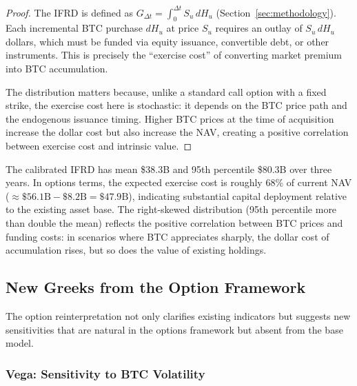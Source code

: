 \begin{proof}
The IFRD is defined as $G_{\Delta t} = \int_0^{\Delta t} S_u\, dH_u$ (Section~\ref{sec:methodology}). Each incremental BTC purchase $dH_u$ at price $S_u$ requires an outlay of $S_u\, dH_u$ dollars, which must be funded via equity issuance, convertible debt, or other instruments. This is precisely the ``exercise cost'' of converting market premium into BTC accumulation.

The distribution matters because, unlike a standard call option with a fixed strike, the exercise cost here is stochastic: it depends on the BTC price path and the endogenous issuance timing. Higher BTC prices at the time of acquisition increase the dollar cost but also increase the NAV, creating a positive correlation between exercise cost and intrinsic value.
\end{proof}

\begin{remark}
\label{rem:ifrd_calibrated}
The calibrated IFRD has mean \$38.3B and 95th percentile \$80.3B over three years. In options terms, the expected exercise cost is roughly 68\% of current NAV ($\approx\$56.1\text{B} - \$8.2\text{B} = \$47.9\text{B}$), indicating substantial capital deployment relative to the existing asset base. The right-skewed distribution (95th percentile more than double the mean) reflects the positive correlation between BTC prices and funding costs: in scenarios where BTC appreciates sharply, the dollar cost of accumulation rises, but so does the value of existing holdings.
\end{remark}

\subsection{New Greeks from the Option Framework}
\label{subsec:new_greeks}

The option reinterpretation not only clarifies existing indicators but suggests new sensitivities that are natural in the options framework but absent from the base model.

\subsubsection{Vega: Sensitivity to BTC Volatility}
\label{subsubsec:vega}

